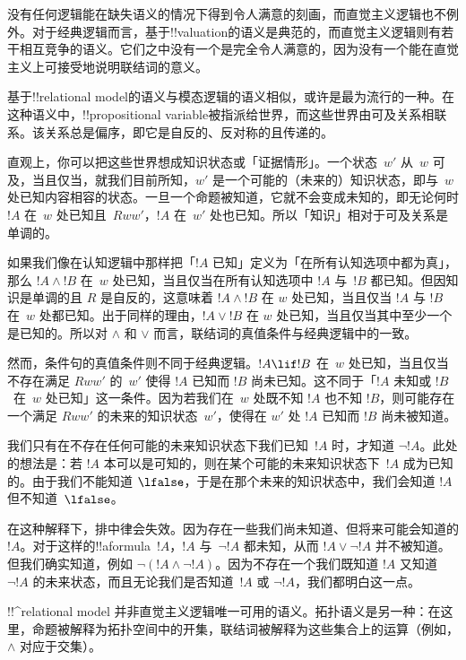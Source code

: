\documentclass[../../../include/open-logic-section]{subfiles}
\begin{document}


没有任何逻辑能在缺失语义的情况下得到令人满意的刻画，而直觉主义逻辑也不例外。对于经典逻辑而言，基于!!{valuation}的语义是典范的，而直觉主义逻辑则有若干相互竞争的语义。它们之中没有一个是完全令人满意的，因为没有一个能在直觉主义上可接受地说明联结词的意义。

基于!!{relational model}的语义与模态逻辑的语义相似，或许是最为流行的一种。在这种语义中，!!{propositional variable}被指派给世界，而这些世界由可及关系相联系。该关系总是偏序，即它是自反的、反对称的且传递的。

直观上，你可以把这些世界想成知识状态或「证据情形」。一个状态~$w'$ 从~$w$ 可及，当且仅当，就我们目前所知，$w'$ 是一个可能的（未来的）知识状态，即与~$w$ 处已知内容相容的状态。一旦一个命题被知道，它就不会变成未知的，即无论何时 $!A$ 在~$w$ 处已知且~$Rww'$，$!A$ 在~$w'$ 处也已知。所以「知识」相对于可及关系是单调的。

如果我们像在认知逻辑中那样把「$!A$ 已知」定义为「在所有认知选项中都为真」，那么 $!A \land !B$ 在~$w$ 处已知，当且仅当在所有认知选项中 $!A$ 与~$!B$ 都已知。但因知识是单调的且 $R$ 是自反的，这意味着 $!A \land !B$ 在 $w$ 处已知，当且仅当 $!A$ 与 $!B$ 在~$w$ 处都已知。出于同样的理由，$!A \lor !B$ 在 $w$ 处已知，当且仅当其中至少一个是已知的。所以对 $\land$ 和 $\lor$ 而言，联结词的真值条件与经典逻辑中的一致。

然而，条件句的真值条件则不同于经典逻辑。$!A \lif !B$ 在~$w$ 处已知，当且仅当不存在满足 $Rww'$ 的~$w'$ 使得 $!A$ 已知而 $!B$ 尚未已知。这不同于「$!A$ 未知或 $!B$~在~$w$ 处已知」这一条件。因为若我们在~$w$ 处既不知 $!A$ 也不知 $!B$，则可能存在一个满足 $Rww'$ 的未来的知识状态~$w'$，使得在 $w'$ 处 $!A$ 已知而 $!B$ 尚未被知道。

我们只有在不存在任何可能的未来知识状态下我们已知~$!A$ 时，才知道 $\lnot !A$。此处的想法是：若 $!A$ 本可以是可知的，则在某个可能的未来知识状态下~$!A$ 成为已知的。由于我们不能知道 $\lfalse$，于是在那个未来的知识状态中，我们会知道 $!A$ 但不知道~$\lfalse$。

在这种解释下，排中律会失效。因为存在一些我们尚未知道、但将来可能会知道的 $!A$。对于这样的!!a{formula}~$!A$，$!A$ 与~$\lnot !A$ 都未知，从而 $!A \lor \lnot !A$ 并不被知道。但我们确实知道，例如 $\lnot(!A \land \lnot !A)$。因为不存在一个我们既知道 $!A$ 又知道 $\lnot !A$ 的未来状态，而且无论我们是否知道~$!A$ 或 $\lnot !A$，我们都明白这一点。

!!^{relational model} 并非直觉主义逻辑唯一可用的语义。拓扑语义是另一种：在这里，命题被解释为拓扑空间中的开集，联结词被解释为这些集合上的运算（例如，$\land$ 对应于交集）。
\end{document}
